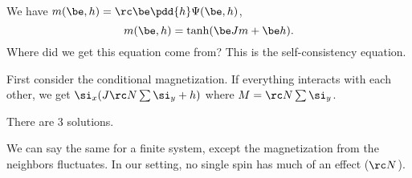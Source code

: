 We have $m(\be,h)= \rc \be \pdd{h}\Psi(\be, h)$, 
\[
m(\be, h) = \tanh(\be J m + \be h).
\]
Where did we get this equation come from? This is the self-consistency equation. 

First consider the conditional magnetization. If everything interacts with each other, we get $\si_x(J\rc N \sum \si_y + h)$ where $M=\rc N \sum \si_y$. %

There are 3 solutions.


We can say the same for a finite system, except the magnetization from the neighbors fluctuates. In our setting, no single spin has much of an effect ($\rc N$). 
